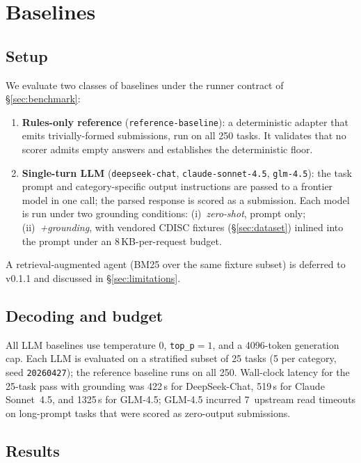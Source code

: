 \section{Baselines}
\label{sec:baselines}

\subsection{Setup}

We evaluate two classes of baselines under the runner contract of
\S\ref{sec:benchmark}:
%
\begin{enumerate}
  \item \textbf{Rules-only reference} (\texttt{reference-baseline}): a
        deterministic adapter that emits trivially-formed submissions, run
        on all 250 tasks. It validates that no scorer admits empty answers
        and establishes the deterministic floor.
  \item \textbf{Single-turn LLM} (\texttt{deepseek-chat},
        \texttt{claude-sonnet-4.5}, \texttt{glm-4.5}): the task prompt and
        category-specific output instructions are passed to a frontier
        model in one call; the parsed response is scored as a submission.
        Each model is run under two grounding conditions:
        (i)~\emph{zero-shot}, prompt only; (ii)~\emph{+grounding}, with
        vendored CDISC fixtures (\S\ref{sec:dataset}) inlined into the
        prompt under an 8\,KB-per-request budget.
\end{enumerate}

A retrieval-augmented agent (BM25 over the same fixture subset) is
deferred to v0.1.1 and discussed in \S\ref{sec:limitations}.

\subsection{Decoding and budget}

All LLM baselines use temperature $0$, \texttt{top\_p}$=1$, and a 4096-token
generation cap. Each LLM is evaluated on a stratified subset of 25 tasks
(5 per category, seed \texttt{20260427}); the reference baseline runs on
all 250. Wall-clock latency for the 25-task pass with grounding was
422\,s for DeepSeek-Chat, 519\,s for Claude Sonnet~4.5, and 1325\,s for
GLM-4.5; GLM-4.5 incurred 7~upstream read timeouts on long-prompt tasks
that were scored as zero-output submissions.

\subsection{Results}

